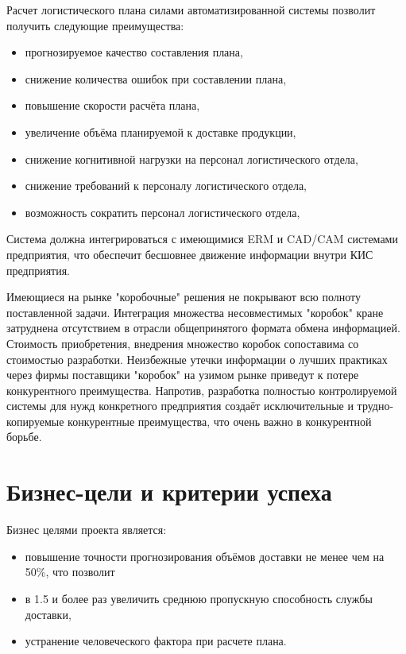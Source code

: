 Расчет логистического плана силами автоматизированной системы позволит получить следующие преимущества:
\begin{itemize}
    \item прогнозируемое качество составления плана,
    \item снижение количества ошибок при составлении плана,
    \item повышение скорости расчёта плана,
    \item увеличение объёма планируемой к доставке продукции,
    \item снижение когнитивной нагрузки на персонал логистического отдела,
    \item снижение требований к персоналу логистического отдела,
    \item возможность сократить персонал логистического отдела,
\end{itemize}

Система должна интегрироваться с имеющимися ERM и CAD/CAM системами предприятия, что обеспечит бесшовнее движение информации внутри КИС предприятия.

Имеющиеся на рынке "коробочные" решения не покрывают всю полноту поставленной задачи.
Интеграция множества несовместимых "коробок" кране затруднена отсутствием в отрасли общепринятого формата обмена информацией.
Стоимость приобретения, внедрения множество коробок сопоставима со стоимостью разработки.
Неизбежные утечки информации о лучших практиках через фирмы поставщики "коробок" на узимом рынке приведут к потере конкурентного преимущества.
Напротив, разработка полностью контролируемой системы для нужд конкретного предприятия создаёт исключительные и трудно-копируемые конкурентные преимущества, что очень важно в конкурентной борьбе.


\section{Бизнес-цели и критерии успеха}
\label{sec:goals}

Бизнес целями проекта является:
\begin{itemize}
    \item повышение точности прогнозирования объёмов доставки не менее чем на 50\%, что позволит
    \item в 1.5 и более раз увеличить среднюю пропускную способность службы доставки,
    \item устранение человеческого фактора при расчете плана.
\end{itemize}


